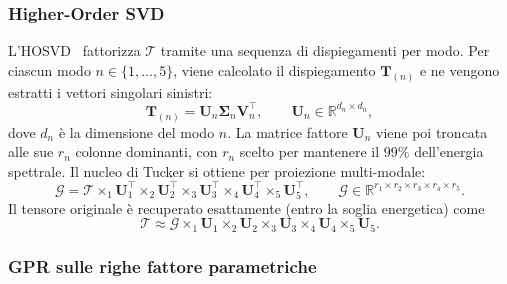 \subsubsection{Higher-Order SVD}

L'HOSVD~\cite{de2000multilinear} fattorizza $\mathcal{T}$ tramite una sequenza di dispiegamenti per modo. Per ciascun modo $n \in \{1,\ldots,5\}$, viene calcolato il dispiegamento $\mathbf{T}_{(n)}$ e ne vengono estratti i vettori singolari sinistri:
\begin{equation}
    \mathbf{T}_{(n)} = \mathbf{U}_n \boldsymbol{\Sigma}_n \mathbf{V}_n^\top,
    \qquad
    \mathbf{U}_n \in \mathbb{R}^{d_n \times d_n},
\end{equation}
dove $d_n$ è la dimensione del modo $n$. La matrice fattore $\mathbf{U}_n$ viene poi troncata alle sue $r_n$ colonne dominanti, con $r_n$ scelto per mantenere il $99\%$ dell'energia spettrale. Il nucleo di Tucker si ottiene per proiezione multi-modale:
\begin{equation}
    \mathcal{G} = \mathcal{T} \times_1 \mathbf{U}_1^\top \times_2 \mathbf{U}_2^\top \times_3 \mathbf{U}_3^\top \times_4 \mathbf{U}_4^\top \times_5 \mathbf{U}_5^\top,
    \qquad
    \mathcal{G} \in \mathbb{R}^{r_1 \times r_2 \times r_3 \times r_4 \times r_5}.
\end{equation}
Il tensore originale è recuperato esattamente (entro la soglia energetica) come
\begin{equation}
    \mathcal{T} \approx \mathcal{G} \times_1 \mathbf{U}_1 \times_2 \mathbf{U}_2 \times_3 \mathbf{U}_3 \times_4 \mathbf{U}_4 \times_5 \mathbf{U}_5.
\end{equation}

\subsubsection{GPR sulle righe fattore parametriche}

